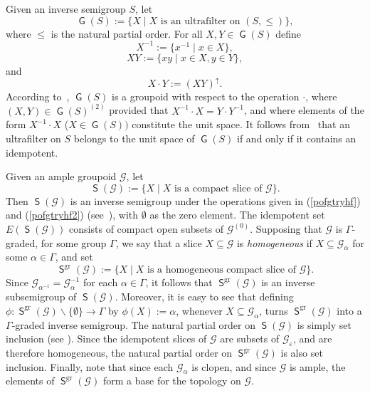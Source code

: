 \documentclass[a4paper,reqno,12pt]{amsart}
\numberwithin{equation}{section}
\theoremstyle{plain}
\theoremstyle{definition}
\newcommand{\gr}{\operatorname{gr}}
\newcommand{\SG}{\operatorname{\mathsf{S}}}
\newcommand{\GP}{\operatorname{\mathsf{G}}}
\begin{document}
Given an inverse semigroup $S$, let 
\[\GP(S):=\big\{X \mid X \text{~is an ultrafilter on~} (S, \leq)\big\},\] 
where $\leq$ is the natural partial order. For all $X,Y \in \GP(S)$ define 
\[X^{-1} := \big\{x^{-1} \mid x \in X\big\},\] 
\[XY :=\big \{xy \mid x \in X, y \in Y\big\},\] 
and 
\[X\cdot Y := (XY)^{\uparrow}.\] 
According to~\cite[Section 2.1]{Lawson3}, $\GP(S)$ is a groupoid with respect to the operation $\cdot$, where $(X,Y) \in \GP(S)^{(2)}$ provided that $X^{-1}\cdot X = Y\cdot Y^{-1}$, and where elements of the form $X^{-1}\cdot X$ ($X \in \GP(S))$ constitute the unit space. It follows from~\cite[Lemma 2.8(2)]{Lawson3} that an ultrafilter on $S$ belongs to the unit space of $\GP(S)$ if and only if it contains an idempotent.

Given an ample groupoid $\mathscr{G}$, let
\[\SG(\mathscr{G}) :=\big\{X\mid X \text{~is a compact slice of~} \mathscr{G}\big\}.\]
Then $\SG(\mathscr{G})$ is an inverse semigroup under the operations given in (\ref{pofgtryhf}) and (\ref{pofgtryhf2}) (see~\cite[Proposition 2.2.4]{paterson1}), with $\emptyset$ as the zero element. The idempotent set $E(\SG(\mathscr{G}))$ consists of compact open subsets of $\mathscr{G}^{(0)}$. Supposing that $\mathscr{G}$ is $\Gamma$-graded, for some group $\Gamma$, we say that a slice $X \subseteq \mathscr{G}$ is \emph{homogeneous} if $X \subseteq \mathscr{G}_\alpha$ for some $\alpha \in \Gamma$, and set
\begin{equation*}
\SG^{\gr}(\mathscr{G}) := \big\{X\mid X \text{~is a homogeneous compact slice of~} \mathscr{G}\big\}.
\end{equation*}
Since $\mathscr{G}_{\alpha^{-1}} = \mathscr{G}_{\alpha}^{-1}$ for each $\alpha \in \Gamma$, it follows that $\SG^{\gr}(\mathscr{G})$ is an inverse subsemigroup of $\SG(\mathscr{G})$. Moreover, it is easy to see that defining $\phi :\SG^{\gr}(\mathscr{G}) \backslash \{\emptyset\} \rightarrow \Gamma$ by $\phi(X) := \alpha$, whenever $X\subseteq \mathscr{G}_\alpha$, turns $\SG^{\gr}(\mathscr{G})$ into a $\Gamma$-graded inverse semigroup. The natural partial order on $\SG(\mathscr{G})$ is simply set inclusion (see \cite[Section 2.2]{paterson1}). Since the idempotent slices of $\mathscr{G}$ are subsets of $\mathscr{G}_{\varepsilon}$, and are therefore homogeneous, the natural partial order on $\SG^{\gr}(\mathscr{G})$ is also set inclusion. Finally, note that since each $\mathscr{G}_\alpha$ is clopen, and since $\mathscr{G}$ is ample, the elements of $\SG^{\gr}(\mathscr{G})$ form a base for the topology on $\mathscr{G}$.
\end{document}
